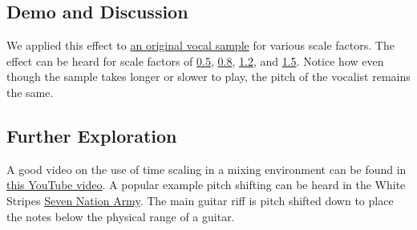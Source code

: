 \subsection{Demo and Discussion}
We applied this effect to \href{run:../InputAudio/22-001 Original Vocal.wav}{an original vocal sample} for various scale factors. The effect can be heard for scale factors of \href{run:../OutputAudio/time-scaling_22-001 Original Vocal_{scale_factor=0.5}.wav}{0.5}, \href{run:../OutputAudio/time-scaling_22-001 Original Vocal_{scale_factor=0.8}.wav}{0.8}, \href{run:../OutputAudio/time-scaling_22-001 Original Vocal_{scale_factor=1.2}.wav}{1.2}, and \href{run:../OutputAudio/time-scaling_22-001 Original Vocal_{scale_factor=1.5}.wav}{1.5}. Notice how even though the sample takes longer or slower to play, the pitch of the vocalist remains the same.

\subsection{Further Exploration}
A good video on the use of time scaling in a mixing environment can be found in \href{https://www.youtube.com/watch?v=ArEPtQ9tQfA}{this YouTube video}. A popular example pitch shifting can be heard in the White Stripes \href{https://www.youtube.com/watch?v=0J2QdDbelmY}{Seven Nation Army}. The main guitar riff is pitch shifted down to place the notes below the physical range of a guitar.